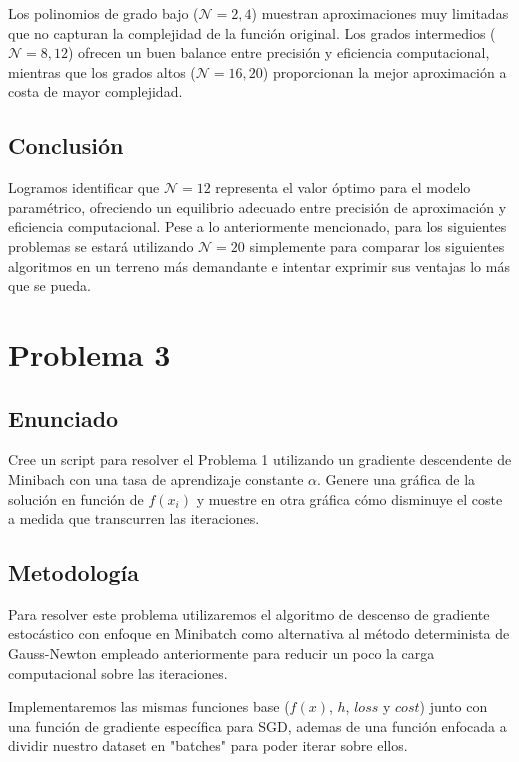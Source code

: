 \documentclass{article}
\begin{document}
Los polinomios de grado bajo ($\mathcal{N} = 2, 4$) muestran aproximaciones muy limitadas que no capturan la complejidad de la función original. Los grados intermedios ($\mathcal{N} = 8, 12$) ofrecen un buen balance entre precisión y eficiencia computacional, mientras que los grados altos ($\mathcal{N} = 16, 20$) proporcionan la mejor aproximación a costa de mayor complejidad.

\subsection{Conclusión}

Logramos identificar que $\mathcal{N} = 12$ representa el valor óptimo para el modelo paramétrico, ofreciendo un equilibrio adecuado entre precisión de aproximación y eficiencia computacional. Pese a lo anteriormente mencionado, para los siguientes problemas se estará utilizando $\mathcal{N} = 20$ simplemente para comparar los siguientes algoritmos en un terreno más demandante e intentar exprimir sus ventajas lo más que se pueda.

\section{Problema 3}

\subsection{Enunciado}

Cree un script para resolver el Problema 1 utilizando un gradiente descendente de Minibach con una tasa de aprendizaje constante $\alpha$. Genere una gráfica de la solución en función de $f(x_i)$ y muestre en otra gráfica cómo disminuye el coste a medida que transcurren las iteraciones.

\subsection{Metodología}

Para resolver este problema utilizaremos el algoritmo de descenso de gradiente estocástico con enfoque en Minibatch como alternativa al método determinista de Gauss-Newton empleado anteriormente para reducir un poco la carga computacional sobre las iteraciones.

Implementaremos las mismas funciones base ($f(x)$, $h$, $loss$ y $cost$) junto con una función de gradiente específica para SGD, ademas de una función enfocada a dividir nuestro dataset en "batches" para poder iterar sobre ellos.
\end{document}
